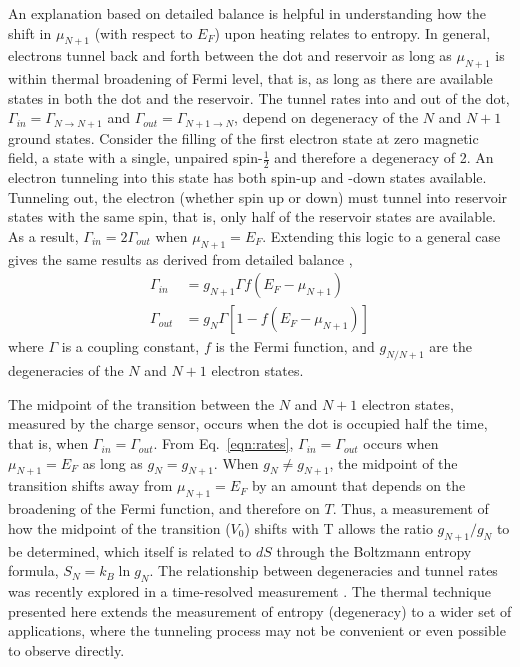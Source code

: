 \documentclass[preprint,showpacs,preprintnumbers,amsmath,amssymb,pra,aps,superscriptaddress]{revtex4-1}
\begin{document}
An explanation based on detailed balance is helpful in understanding how the shift in $\mu_{N+1}$ (with respect to $E_F$) upon heating relates to entropy.   In general, electrons tunnel back and forth between the dot and reservoir as long as $\mu_{N+1}$ is within thermal broadening of Fermi level, that is, as long as there are available states in both the dot and the reservoir.  The tunnel rates into and out of the dot, $\Gamma_{in}=\Gamma_{N\rightarrow N+1}$ and $\Gamma_{out}=\Gamma_{N+1\rightarrow N}$, depend on degeneracy of the $N$ and $N+1$ ground states.  Consider the filling of the first electron state at zero magnetic field, a state with a single, unpaired spin-$\frac{1}{2}$ and therefore a degeneracy of 2. An electron tunneling into this state has both spin-up and -down states available.  Tunneling out, the electron (whether spin up or down) must tunnel into reservoir states with the same spin, that is, only half of the reservoir states are available. As a result, $\Gamma_{in} = 2\Gamma_{out}$ when $\mu_{N+1}=E_F$. Extending this logic to a general case gives the same results as derived from detailed balance \cite{Gustavsson2009}, 
%
\begin{align}
	\Gamma_{in} &=  g_{N+1} \Gamma f(E_F - \mu_{N+1}) \label{eqn:rates}\\
	\Gamma_{out} &= g_{N} \Gamma [1 - f(E_F - \mu_{N+1})] \nonumber
\end{align}
%
where $\Gamma$ is a coupling constant, $f$ is the Fermi function, and $g_{N/N+1}$ are the degeneracies of the $N$ and $N+1$ electron states.

The midpoint of the transition between the $N$ and $N+1$ electron states, measured by the charge sensor, occurs when the dot is occupied half the time, that is, when $\Gamma_{in} = \Gamma_{out}$. From Eq.~\ref{eqn:rates}, $\Gamma_{in} = \Gamma_{out}$ occurs when $\mu_{N+1} = E_F$ as long as $g_{N}=g_{N+1}$. When $g_{N}\neq g_{N+1}$, the midpoint of the transition shifts away from $\mu_{N+1}=E_F$ by an amount that depends on the broadening of the Fermi function, and therefore on $T$.   Thus, a measurement of how the midpoint of the transition ($V_0$) shifts with T allows the ratio $g_{N+1}/g_{N}$ to be determined, which itself is related to $dS$ through the Boltzmann entropy formula, $S_{N}=k_{B} \ln{g_N}$.  The relationship between degeneracies and tunnel rates was recently explored in a time-resolved measurement \cite{Hofmann2016}.  The thermal technique presented here extends the measurement of entropy (degeneracy) to a wider set of applications, where the tunneling process may not be convenient or even possible to observe directly.
\end{document}
